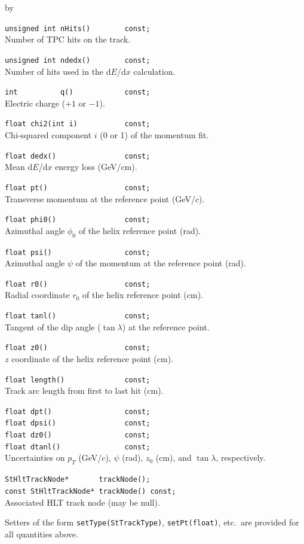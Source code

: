 \documentclass[twoside]{article}
\newcommand{\entrylabel}[1]{\mbox{\textbf{{#1}}}\hfil}%
\newenvironment{entry}
{\begin{list}{}%
    {\renewcommand{\makelabel}{\entrylabel}%
     \setlength{\labelwidth}{90pt}%
     \setlength{\leftmargin}{\labelwidth}
     \advance\leftmargin by \labelsep%
      }%
    }%
  {\end{list}}
\newcommand{\Entrylabel}[1]%
{\raisebox{0pt}[1ex][0pt]{\makebox[\labelwidth][l]%
    {\parbox[t]{\labelwidth}{\hspace{0pt}\textbf{{#1}}}}}}
\newenvironment{Entry}%
{\renewcommand{\entrylabel}{\Entrylabel}\begin{entry}}%
  {\end{entry}}
\begin{document}
\begin{Entry}
    \verb+unsigned int nHits()        const;+\\
    Number of TPC hits on the track.

    \verb+unsigned int ndedx()        const;+\\
    Number of hits used in the d$E$/d$x$ calculation.

    \verb+int          q()            const;+\\
    Electric charge ($+1$ or $-1$).

    \verb+float chi2(int i)           const;+\\
    Chi-squared component $i$ (0 or 1) of the momentum fit.

    \verb+float dedx()                const;+\\
    Mean d$E$/d$x$ energy loss (GeV/cm).

    \verb+float pt()                  const;+\\
    Transverse momentum at the reference point (GeV/$c$).

    \verb+float phi0()                const;+\\
    Azimuthal angle $\phi_0$ of the helix reference point (rad).

    \verb+float psi()                 const;+\\
    Azimuthal angle $\psi$ of the momentum at the reference point (rad).

    \verb+float r0()                  const;+\\
    Radial coordinate $r_0$ of the helix reference point (cm).

    \verb+float tanl()                const;+\\
    Tangent of the dip angle ($\tan\lambda$) at the reference point.

    \verb+float z0()                  const;+\\
    $z$ coordinate of the helix reference point (cm).

    \verb+float length()              const;+\\
    Track arc length from first to last hit (cm).

    \verb+float dpt()                 const;+\\
    \verb+float dpsi()                const;+\\
    \verb+float dz0()                 const;+\\
    \verb+float dtanl()               const;+\\
    Uncertainties on $p_T$ (GeV/$c$), $\psi$ (rad), $z_0$ (cm), and
    $\tan\lambda$, respectively.

    \verb+StHltTrackNode*       trackNode();+\\
    \verb+const StHltTrackNode* trackNode() const;+\\
    Associated HLT track node (may be null).

    Setters of the form \verb+setType(StTrackType)+,
    \verb+setPt(float)+, etc.\ are provided for all quantities above.
\end{Entry}
\clearpage
\end{document}
